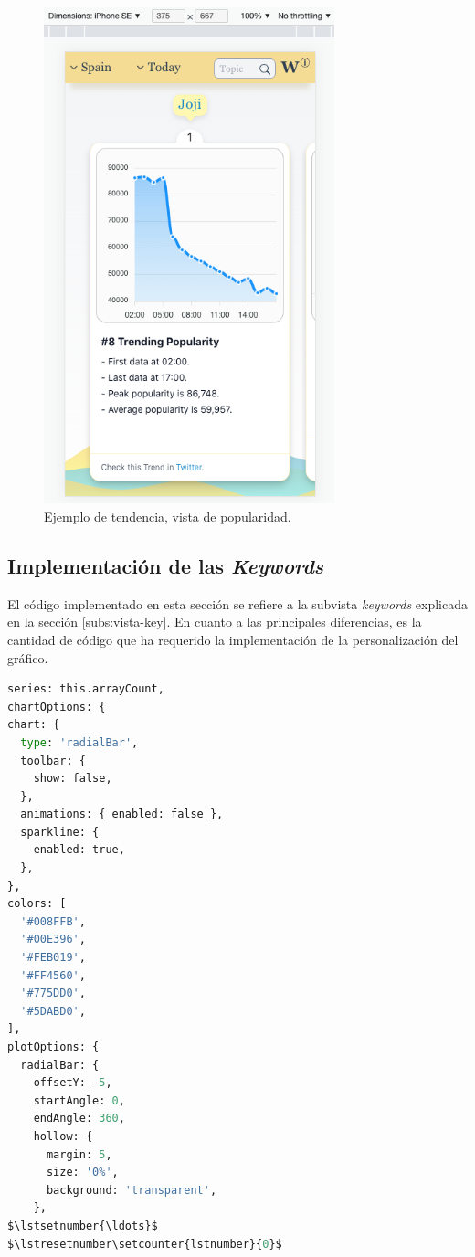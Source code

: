 \begin{figure}[H]
    \centering
    \myfloatalign
    \includegraphics[width=0.75\textwidth]{gfx/ejemplo2.png}
    \caption[Ejemplo de tendencia, vista de popularidad]{Ejemplo de tendencia, vista de popularidad.}\label{gfx:ejemplo2}
\end{figure}

\subsection{Implementación de las \textit{Keywords}}
El código implementado en esta sección se refiere a la subvista \textit{keywords} explicada en la sección \ref{subs:vista-key}. En cuanto a las principales diferencias, es la cantidad de código que ha requerido la implementación de la personalización del gráfico.

\vspace{0.3cm}

\begin{lstlisting}[caption=Diferencias destacables de la implementación de las keywords,language=Python, mathescape=true]
series: this.arrayCount,
chartOptions: {
chart: {
  type: 'radialBar',
  toolbar: {
    show: false,
  },
  animations: { enabled: false },
  sparkline: {
    enabled: true,
  },
},
colors: [
  '#008FFB',
  '#00E396',
  '#FEB019',
  '#FF4560',
  '#775DD0',
  '#5DABD0',
],
plotOptions: {
  radialBar: {
    offsetY: -5,
    startAngle: 0,
    endAngle: 360,
    hollow: {
      margin: 5,
      size: '0%',
      background: 'transparent',
    },
$\lstsetnumber{\ldots}$
$\lstresetnumber\setcounter{lstnumber}{0}$
\end{lstlisting}

